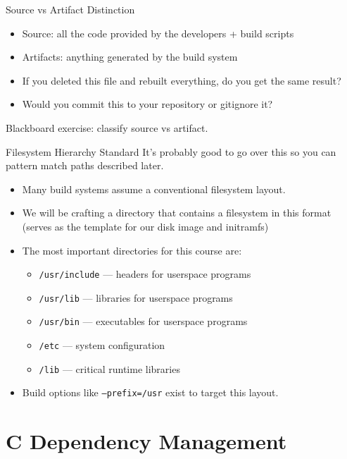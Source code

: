 \documentclass{../lecture}
\begin{document}
\begin{frame}{Source vs Artifact Distinction}
  \begin{itemize}
    \item Source: all the code provided by the developers + build scripts
    \item Artifacts: anything generated by the build system
    \item If you deleted this file and rebuilt everything, do you get the same result?
    \item Would you commit this to your repository or gitignore it?
  \end{itemize}
  Blackboard exercise: classify source vs artifact.
\end{frame}

\begin{frame}{Filesystem Hierarchy Standard}
It's probably good to go over this so you can pattern match paths described later.
\begin{itemize}
  \item Many build systems assume a conventional filesystem layout.
  \item We will be crafting a directory that contains a filesystem in this
    format (serves as the template for our disk image and initramfs)
  \item The most important directories for this course are:
    \begin{itemize}
      \item \texttt{/usr/include} — headers for userspace programs
      \item \texttt{/usr/lib} — libraries for userspace programs
      \item \texttt{/usr/bin} — executables for userspace programs
      \item \texttt{/etc} — system configuration
      \item \texttt{/lib} — critical runtime libraries
    \end{itemize}
  \item Build options like \texttt{--prefix=/usr} exist to target this layout.
\end{itemize}
\end{frame}

\section{C Dependency Management}
\end{document}
